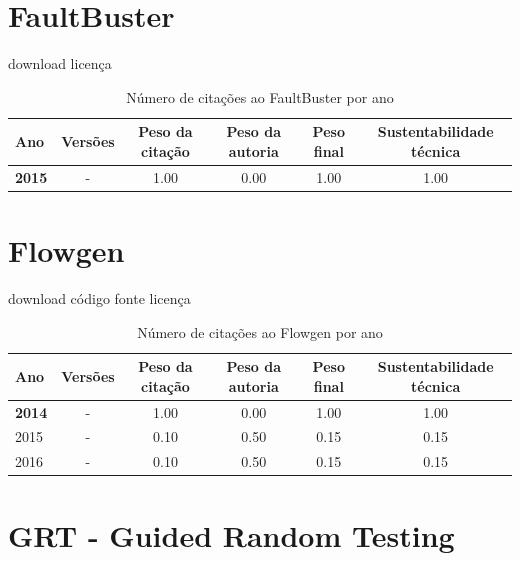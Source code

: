 \section{FaultBuster}
\checkmark download
\checkmark licença


\begin{table}[H]
\caption{Número de citações ao FaultBuster por ano}
\centering
\begin{tabular}{| l | c | c | c | c | c |}
  \hline
  Ano & Versões & Peso da citação & Peso da autoria & Peso final & Sustentabilidade técnica \\
  \hline
            {\bf 2015}
          &
          -
          &
          1.00
          &
          0.00
          &
          1.00
          &
            {\color{blue} 1.00}
          \\
\hline
\end{tabular}
\end{table}



\section{Flowgen}
\checkmark download
\checkmark código fonte
\checkmark licença


\begin{table}[H]
\caption{Número de citações ao Flowgen por ano}
\centering
\begin{tabular}{| l | c | c | c | c | c |}
  \hline
  Ano & Versões & Peso da citação & Peso da autoria & Peso final & Sustentabilidade técnica \\
  \hline
            {\bf 2014}
          &
          -
          &
          1.00
          &
          0.00
          &
          1.00
          &
            {\color{blue} 1.00}
          \\
\hline
            2015
          &
          -
          &
          0.10
          &
          0.50
          &
          0.15
          &
            {\color{red} 0.15}
          \\
\hline
            2016
          &
          -
          &
          0.10
          &
          0.50
          &
          0.15
          &
            {\color{red} 0.15}
          \\
\hline
\end{tabular}
\end{table}



\section{GRT - Guided Random Testing}


